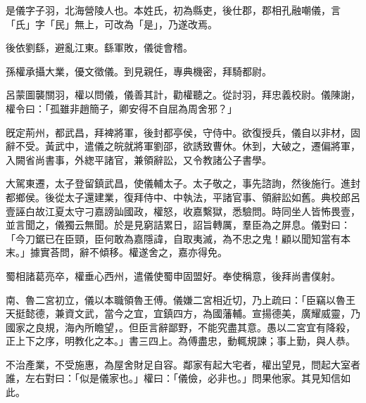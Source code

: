 \begin{pinyinscope}
 
 
 是儀字子羽，北海營陵人也。本姓氏，初為縣吏，後仕郡，郡相孔融嘲儀，言「氏」字「民」無上，可改為「是」，乃遂改焉。
 
 
 後依劉繇，避亂江東。繇軍敗，儀徙會稽。
 
 
 
 
 孫權承攝大業，優文徵儀。到見親任，專典機密，拜騎都尉。
 
 
 
 
 呂蒙圖襲關羽，權以問儀，儀善其計，勸權聽之。從討羽，拜忠義校尉。儀陳謝，權令曰：「孤雖非趙簡子，卿安得不自屈為周舍邪？」
 
 
 
 
 旣定荊州，都武昌，拜裨將軍，後封都亭侯，守侍中。欲復授兵，儀自以非材，固辭不受。黃武中，遣儀之皖就將軍劉邵，欲誘致曹休。休到，大破之，遷偏將軍，入闕省尚書事，外緫平諸官，兼領辭訟，又令教諸公子書學。
 
 
大駕東遷，太子登留鎮武昌，使儀輔太子。太子敬之，事先諮詢，然後施行。進封都鄉侯。後從太子還建業，復拜侍中、中執法，平諸官事、領辭訟如舊。典校郎呂壹誣白故江夏太守刁嘉謗訕國政，權怒，收嘉繫獄，悉驗問。時同坐人皆怖畏壹，並言聞之，儀獨云無聞。於是見窮詰累日，詔旨轉厲，羣臣為之屏息。儀對曰：「今刀鋸已在臣頸，臣何敢為嘉隱諱，自取夷滅，為不忠之鬼！顧以聞知當有本末。」據實荅問，辭不傾移。權遂舍之，嘉亦得免。
 
 
 
 
 蜀相諸葛亮卒，權垂心西州，遣儀使蜀申固盟好。奉使稱意，後拜尚書僕射。
 
 
 
 
 南、魯二宮初立，儀以本職領魯王傅。儀嫌二宮相近切，乃上疏曰：「臣竊以魯王天挺懿德，兼資文武，當今之宜，宜鎮四方，為國藩輔。宣揚德美，廣耀威靈，乃國家之良規，海內所瞻望，。但臣言辭鄙野，不能究盡其意。愚以二宮宜有降殺，正上下之序，明教化之本。」書三四上。為傅盡忠，動輒規諫；事上勤，與人恭。
 
 
 
 
 不治產業，不受施惠，為屋舍財足自容。鄰家有起大宅者，權出望見，問起大室者誰，左右對曰：「似是儀家也。」權曰：「儀儉，必非也。」問果他家。其見知信如此。
 

\end{pinyinscope}
